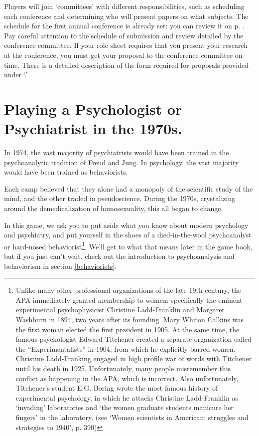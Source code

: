 \begin{refsection}
Players will join `committees' with different responsibilities, such as scheduling each conference and determining who will present papers on what subjects. The schedule for the first annual conference is already set: you can review it on p.  . Pay careful attention to the schedule of submission and review detailed by the conference committee. If your role sheet requires that you present your research at the conference, you must get your proposal to the conference committee on time. There is a detailed description of the form required for proposals provided under `.' 

\section{Playing a Psychologist or Psychiatrist in the 1970s.}
\label{playingapsychologistorpsychiatristinthe1970s.}

In 1974, the vast majority of psychiatrists would have been trained in the psychoanalytic tradition of Freud and Jung. In psychology, the vast majority would have been trained as behaviorists.

Each camp believed that they alone had a monopoly of the scientific study of the mind, and the other traded in pseudoscience. During the 1970s, crystalizing around the demedicalization of homosexuality, this all began to change. 

In this game, we ask you to put aside what you know about modern psychology and psychiatry, and put yourself in the shoes of a died-in-the-wool psychoanalyst or hard-nosed behaviorist\footnote{Unlike many other professional organizations of the late 19th century, the APA immediately granted membership to women: specifically the eminent experimental psychophysicist Christine Ladd-Franklin and Margaret Washburn in 1894, two years after its founding. Mary Whiton Calkins was the first woman elected the first president in 1905.⁠
At the same time, the famous psychologist Edward Titchener created a separate organization called the ``Experimentalists'' in 1904, from which he explicitly barred women. Christine Ladd-Franking engaged in high profile war of words with Titchener until his death in 1925. Unfortunately, many people misremember this conflict as happening in the APA, which is incorrect. Also unfortunately, Titchener's student E.G. Boring wrote the most famous history of experimental psychology, in which he attacks Christine Ladd-Franklin as `invading' laboratories and `the women graduate students manicure her fingers' in the laboratory. (see `Women scientists in American: struggles and strategies to 1940', p. 390)}. We'll get to what that means later in the game book, but if you just can't wait, check out the introduction to psychoanalysis and behaviorism in section \ref{behaviorists}.


\end{refsection}
